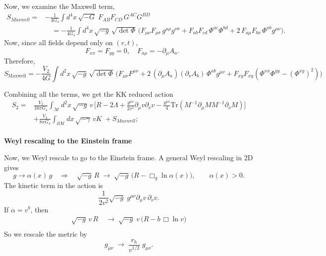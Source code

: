 \documentclass[a4paper,11pt]{article}
\begin{document}
Now, we examine the Maxwell term,
\begin{equation}
\begin{aligned}
S_{Maxwell}=&-\frac{1}{4G_4}\int d^4x\,\sqrt{-G}\;F_{AB}F_{CD}\,G^{AC}G^{BD}\\
&\quad=-\frac{1}{4G_4}\int d^4x\,\sqrt{-g}\,\sqrt{\det\Phi}\,\Big(F_{\mu\nu}F_{\rho\sigma}\,g^{\mu\rho}g^{\nu\sigma}
+F_{ab}F_{cd}\,\Phi^{ac}\Phi^{bd}
+2\,F_{a\mu}F_{b\nu}\,\Phi^{ab}g^{\mu\nu}\Big).
\end{aligned}
\label{eq:KK-F2-reduce}
\end{equation}
Now, since all fields depend only on $(r,t)$,
\begin{equation}
\quad F_{xx}=F_{yy}=0,\quad F_{a\mu}=-\partial_\mu A_a .
\label{eq:KK-Fcomp}
\end{equation}
Therefore,
\begin{equation}
S_{\text{Maxwell}}=-\frac{V_2}{4G}\int d^2x\,\sqrt{-g}\,\sqrt{\det\Phi}\,\Big(F_{\mu\nu}F^{\mu\nu}
+2\,(\partial_\mu A_a)(\partial_\nu A_b)\,\Phi^{ab}g^{\mu\nu} + F_{xy}F_{xy} (\Phi^{xx} \Phi^{yy} - (\Phi^{xy}) ^2 )\Big)
\label{eq:KK-Smax-jordan}
\end{equation}

Combining all the terms, we get the KK reduced action
\begin{equation}
\begin{aligned}
S_2=&\frac{V_2}{16\pi G_4}\int_{\mathcal M} d^2x\,\sqrt{-g}\,v\,
\Big[R-2\Lambda + \frac{g^{\mu \nu}}{2 v^2} \partial_\mu v \partial_\nu v
- \frac{g^{\mu \nu}}{4}\text{Tr}(M^{-1}\partial_\mu M M^{-1}\partial_\nu M)\Big]\\
 & +\frac{V_2}{8\pi G_4}\int_{\partial\mathcal M} dx\,\sqrt{-\gamma}\,vK\;+ S_{Maxwell};
\end{aligned}
\label{eq:KK-reduced}
\end{equation}
\\
\textbf{Weyl rescaling to the Einstein frame}

Now, we Weyl rescale to go to the Einstein frame. A general Weyl rescaling in 2D gives
\begin{equation}
g\to\alpha(x)\,g\quad\Rightarrow\quad \sqrt{-g}\,R\;\to\;\sqrt{-g}\,\big(R-\Box_g\ln\alpha(x)\big),\qquad \alpha(x)>0 .
\label{eq:KK-weyl}
\end{equation}
The kinetic term in the action is
\begin{equation}
\frac{1}{2v^2}\sqrt{-g}\;g^{\mu\nu}\partial_\mu v\,\partial_\nu v .
\label{eq:KK-vkin}
\end{equation}
If $\alpha=v^b$, then
\begin{equation}
\begin{aligned}
\sqrt{-g}\,v\,R\;&\to\;\sqrt{-g}\;v\,\big(R-b\,\Box\ln v\big)\\
\end{aligned}
\label{eq:KK-weyl-v}
\end{equation}
So we rescale the metric by
\begin{equation}
g_{\mu\nu}\;\to\;\frac{r_h}{v^{1/2}}\;g_{\mu\nu}.
\label{eq:KK-rescale}
\end{equation}
\end{document}
